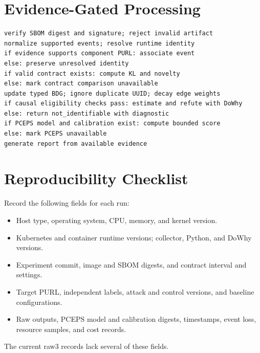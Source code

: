 \documentclass[12pt,a4paper,oneside]{report}
\begin{document}
\section{Evidence-Gated Processing}
\begin{lstlisting}[basicstyle=\ttfamily\small,breaklines=true,frame=single]
verify SBOM digest and signature; reject invalid artifact
normalize supported events; resolve runtime identity
if evidence supports component PURL: associate event
else: preserve unresolved identity
if valid contract exists: compute KL and novelty
else: mark contract comparison unavailable
update typed BDG; ignore duplicate UUID; decay edge weights
if causal eligibility checks pass: estimate and refute with DoWhy
else: return not_identifiable with diagnostic
if PCEPS model and calibration exist: compute bounded score
else: mark PCEPS unavailable
generate report from available evidence
\end{lstlisting}
\section{Reproducibility Checklist}
Record the following fields for each run:
\begin{itemize}[leftmargin=*]
\item Host type, operating system, CPU, memory, and kernel version.
\item Kubernetes and container runtime versions; collector, Python, and DoWhy versions.
\item Experiment commit, image and SBOM digests, and contract interval and settings.
\item Target PURL, independent labels, attack and control versions, and baseline configurations.
\item Raw outputs, PCEPS model and calibration digests, timestamps, event loss, resource samples, and cost records.
\end{itemize}
The current raw3 records lack several of these fields.
\end{document}
